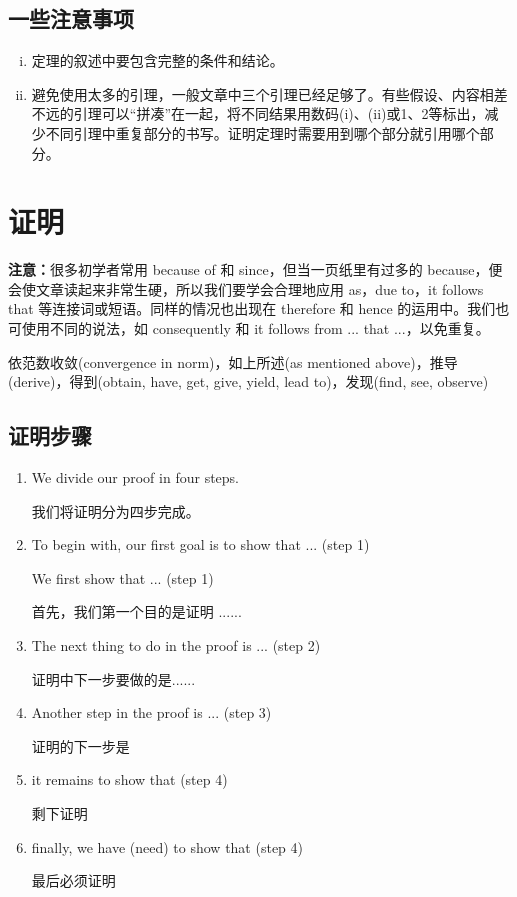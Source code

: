 \documentclass[11pt,final]{article}
\numberwithin{equation}{section}
\begin{document}
\subsection{一些注意事项}
\begin{enumerate}[(i)]
	\item 定理的叙述中要包含完整的条件和结论。
	\item 避免使用太多的引理，一般文章中三个引理已经足够了。有些假设、内容相差不远的引理可以``拼凑”在一起，将不同结果用数码(i)、(ii)或1、2等标出，减少不同引理中重复部分的书写。证明定理时需要用到哪个部分就引用哪个部分。
\end{enumerate}

\section{证明}
\textbf{注意：}很多初学者常用 because of 和 since，但当一页纸里有过多的 because，便会使文章读起来非常生硬，所以我们要学会合理地应用 as，due to，it follows that 等连接词或短语。同样的情况也出现在 therefore 和 hence 的运用中。我们也可使用不同的说法，如 consequently 和 it follows from ... that ...，以免重复。


依范数收敛(convergence in norm)，如上所述(as mentioned above)，推导(derive)，得到(obtain, have, get, give, yield, lead to)，发现(find, see, observe)

\subsection{证明步骤}
\begin{enumerate}
	\item We divide our proof in four steps.
	
	我们将证明分为四步完成。
	
	\item To begin with, our first goal is to show that ... (step 1)
	
	We first show that ...  (step 1)
	 
	首先，我们第一个目的是证明 ......
	\item The next thing to do in the proof is ... (step 2)
	
	证明中下一步要做的是......
	\item Another step in the proof is ... (step 3)
	
	证明的下一步是
	\item it remains to show that (step 4)
	
	剩下证明
	\item finally, we have (need) to show that (step 4)
	
	最后必须证明
\end{enumerate}
\end{document}
